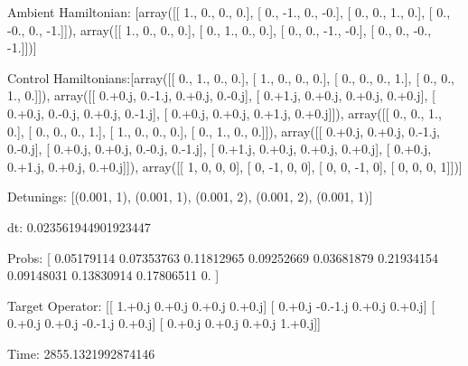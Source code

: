 \documentclass{article}
\begin{document}
    

\newpage

Ambient Hamiltonian: [array([[ 1.,  0.,  0.,  0.],
       [ 0., -1.,  0., -0.],
       [ 0.,  0.,  1.,  0.],
       [ 0., -0.,  0., -1.]]), array([[ 1.,  0.,  0.,  0.],
       [ 0.,  1.,  0.,  0.],
       [ 0.,  0., -1., -0.],
       [ 0.,  0., -0., -1.]])]

Control Hamiltonians:[array([[ 0.,  1.,  0.,  0.],
       [ 1.,  0.,  0.,  0.],
       [ 0.,  0.,  0.,  1.],
       [ 0.,  0.,  1.,  0.]]), array([[ 0.+0.j,  0.-1.j,  0.+0.j,  0.-0.j],
       [ 0.+1.j,  0.+0.j,  0.+0.j,  0.+0.j],
       [ 0.+0.j,  0.-0.j,  0.+0.j,  0.-1.j],
       [ 0.+0.j,  0.+0.j,  0.+1.j,  0.+0.j]]), array([[ 0.,  0.,  1.,  0.],
       [ 0.,  0.,  0.,  1.],
       [ 1.,  0.,  0.,  0.],
       [ 0.,  1.,  0.,  0.]]), array([[ 0.+0.j,  0.+0.j,  0.-1.j,  0.-0.j],
       [ 0.+0.j,  0.+0.j,  0.-0.j,  0.-1.j],
       [ 0.+1.j,  0.+0.j,  0.+0.j,  0.+0.j],
       [ 0.+0.j,  0.+1.j,  0.+0.j,  0.+0.j]]), array([[ 1,  0,  0,  0],
       [ 0, -1,  0,  0],
       [ 0,  0, -1,  0],
       [ 0,  0,  0,  1]])]

Detunings: [(0.001, 1), (0.001, 1), (0.001, 2), (0.001, 2), (0.001, 1)]

 dt: 0.023561944901923447

Probs: [ 0.05179114  0.07353763  0.11812965  0.09252669  0.03681879  0.21934154
  0.09148031  0.13830914  0.17806511  0.        ]

Target Operator: [[ 1.+0.j  0.+0.j  0.+0.j  0.+0.j]
 [ 0.+0.j -0.-1.j  0.+0.j  0.+0.j]
 [ 0.+0.j  0.+0.j -0.-1.j  0.+0.j]
 [ 0.+0.j  0.+0.j  0.+0.j  1.+0.j]]

Time: 2855.1321992874146
\end{document}
